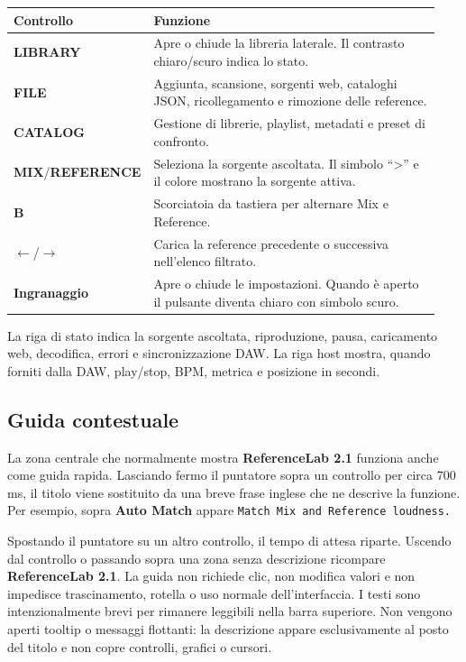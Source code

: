 \documentclass[11pt,a4paper]{article}
\newcommand{\control}[1]{\textbf{\textsf{#1}}}
\begin{document}
\begin{longtable}{p{0.24\linewidth}p{0.70\linewidth}}
\toprule
\textbf{Controllo} & \textbf{Funzione}\\
\midrule
\endhead
\control{LIBRARY} & Apre o chiude la libreria laterale. Il contrasto
chiaro/scuro indica lo stato.\\
\control{FILE} & Aggiunta, scansione, sorgenti web, cataloghi JSON,
ricollegamento e rimozione delle reference.\\
\control{CATALOG} & Gestione di librerie, playlist, metadati e preset di
confronto.\\
\control{MIX}/\control{REFERENCE} & Seleziona la sorgente ascoltata. Il simbolo
``\textgreater'' e il colore mostrano la sorgente attiva.\\
\control{B} & Scorciatoia da tastiera per alternare Mix e Reference.\\
\control{\(\leftarrow\)}/\control{\(\rightarrow\)} & Carica la reference
precedente o successiva nell'elenco filtrato.\\
\control{Ingranaggio} & Apre o chiude le impostazioni. Quando è aperto il
pulsante diventa chiaro con simbolo scuro.\\
\bottomrule
\end{longtable}

La riga di stato indica la sorgente ascoltata, riproduzione, pausa, caricamento
web, decodifica, errori e sincronizzazione DAW. La riga host mostra, quando
forniti dalla DAW, play/stop, BPM, metrica e posizione in secondi.

\subsection{Guida contestuale}

La zona centrale che normalmente mostra \control{ReferenceLab 2.1} funziona
anche come guida rapida. Lasciando fermo il puntatore sopra un controllo per
circa 700 ms, il titolo viene sostituito da una breve frase inglese che ne
descrive la funzione. Per esempio, sopra \control{Auto Match} appare
\texttt{Match Mix and Reference loudness.}

Spostando il puntatore su un altro controllo, il tempo di attesa riparte.
Uscendo dal controllo o passando sopra una zona senza descrizione ricompare
\control{ReferenceLab 2.1}. La guida non richiede clic, non modifica valori e
non impedisce trascinamento, rotella o uso normale dell'interfaccia. I testi
sono intenzionalmente brevi per rimanere leggibili nella barra superiore.
Non vengono aperti tooltip o messaggi flottanti: la descrizione appare
esclusivamente al posto del titolo e non copre controlli, grafici o cursori.
\end{document}
